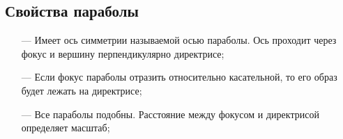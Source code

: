 \documentclass[12pt, fleqn]{extarticle}
\begin{document}
\subsection*{Свойства параболы}

\begin{itemize}
    \item[—]{Имеет ось симметрии называемой осью параболы. Ось проходит через фокус и вершину перпендикулярно директрисе;}
    \item[—]{Если фокус параболы отразить относительно касательной, то его образ будет лежать на директрисе;}
    \item[—]{Все параболы подобны. Расстояние между фокусом и директрисой определяет масштаб;}
\end{itemize}
\end{document}

